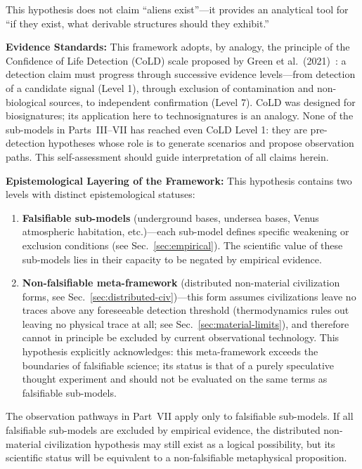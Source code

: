 \documentclass[aps,prd,twocolumn,superscriptaddress,nofootinbib]{revtex4-2}
\begin{document}
This hypothesis does not claim ``aliens exist''---it provides an analytical tool for ``if they exist, what derivable structures should they exhibit.''

\textbf{Evidence Standards:} This framework adopts, by analogy, the principle of the Confidence of Life Detection (CoLD) scale proposed by Green et al.\ (2021)~\cite{Green2021}: a detection claim must progress through successive evidence levels---from detection of a candidate signal (Level 1), through exclusion of contamination and non-biological sources, to independent confirmation (Level 7). CoLD was designed for biosignatures; its application here to technosignatures is an analogy. None of the sub-models in Parts~III--VII has reached even CoLD Level 1: they are pre-detection hypotheses whose role is to generate scenarios and propose observation paths. This self-assessment should guide interpretation of all claims herein.

\textbf{Epistemological Layering of the Framework:} This hypothesis contains two levels with distinct epistemological statuses:

\begin{enumerate}
  \item \textbf{Falsifiable sub-models} (underground bases, undersea bases, Venus atmospheric habitation, etc.)---each sub-model defines specific weakening or exclusion conditions (see Sec.~\ref{sec:empirical}). The scientific value of these sub-models lies in their capacity to be negated by empirical evidence.
  \item \textbf{Non-falsifiable meta-framework} (distributed non-material civilization forms, see Sec.~\ref{sec:distributed-civ})---this form assumes civilizations leave no traces above any foreseeable detection threshold (thermodynamics rules out leaving no physical trace at all; see Sec.~\ref{sec:material-limits}), and therefore cannot in principle be excluded by current observational technology. This hypothesis explicitly acknowledges: this meta-framework exceeds the boundaries of falsifiable science; its status is that of a purely speculative thought experiment and should not be evaluated on the same terms as falsifiable sub-models.
\end{enumerate}

The observation pathways in Part~VII apply only to falsifiable sub-models. If all falsifiable sub-models are excluded by empirical evidence, the distributed non-material civilization hypothesis may still exist as a logical possibility, but its scientific status will be equivalent to a non-falsifiable metaphysical proposition.
\end{document}
